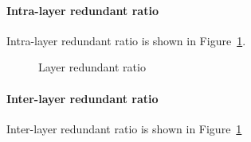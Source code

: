 \paragraph{Intra-layer redundant ratio} Intra-layer redundant ratio is shown in Figure~\ref{fig:layer-dedup_cdf_and_hist_layer}.

\begin{figure}
	\centering
	\caption{Layer redundant ratio}
	\label{fig:layer-dedup_cdf_and_hist_layer}
\end{figure}

\paragraph{Inter-layer redundant ratio} Inter-layer redundant ratio is shown in Figure~\ref{fig:layer-dedup_cdf_and_hist_layer}

